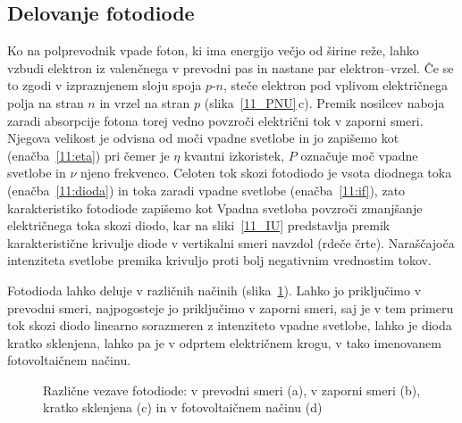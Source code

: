  
\subsection*{Delovanje fotodiode}
Ko na polprevodnik vpade foton, ki ima energijo večjo od širine reže, 
lahko vzbudi elektron iz valenčnega v prevodni pas in nastane par elektron--vrzel. 
Če se to zgodi v izpraznjenem sloju spoja $p$-$n$, steče elektron pod vplivom 
električnega polja na stran $n$ in vrzel na stran $p$ (slika~\ref{11_PNU}\,c). 
Premik nosilcev naboja zaradi absorpcije fotona torej vedno
povzroči električni tok v zaporni smeri. 
Njegova velikost je odvisna od moči vpadne svetlobe in jo zapišemo kot 
(enačba~\ref{11:eta})
pri čemer je $\eta$ kvantni izkoristek, $P$ označuje moč vpadne svetlobe in $\nu$ njeno
frekvenco. Celoten tok skozi fotodiodo je vsota diodnega toka (enačba~\ref{11:dioda}) 
in toka zaradi vpadne svetlobe (enačba~\ref{11:if}), zato karakteristiko fotodiode zapišemo kot 
Vpadna svetloba povzroči zmanjšanje električnega toka skozi diodo, 
kar na sliki~\ref{11_IU} predstavlja premik karakteristične krivulje diode v vertikalni 
smeri navzdol (rdeče črte). Naraščajoča intenziteta svetlobe premika krivuljo proti 
bolj negativnim vrednostim tokov. 

Fotodioda lahko deluje v različnih načinih (slika~\ref{11_PD}). 
Lahko jo priključimo v prevodni smeri,
najpogosteje jo priključimo v zaporni smeri, saj je v
tem primeru tok skozi diodo linearno sorazmeren z intenziteto vpadne svetlobe, lahko 
je dioda kratko sklenjena, lahko pa je v odprtem električnem krogu, v tako imenovanem fotovoltaičnem 
načinu. 
\begin{figure}[ht]
\centering
\def\svgwidth{130truemm} 

\caption{Različne vezave fotodiode: v prevodni smeri (a), v zaporni smeri (b), kratko sklenjena (c) in 
v fotovoltaičnem načinu (d)}
\label{11_PD}
\end{figure}

